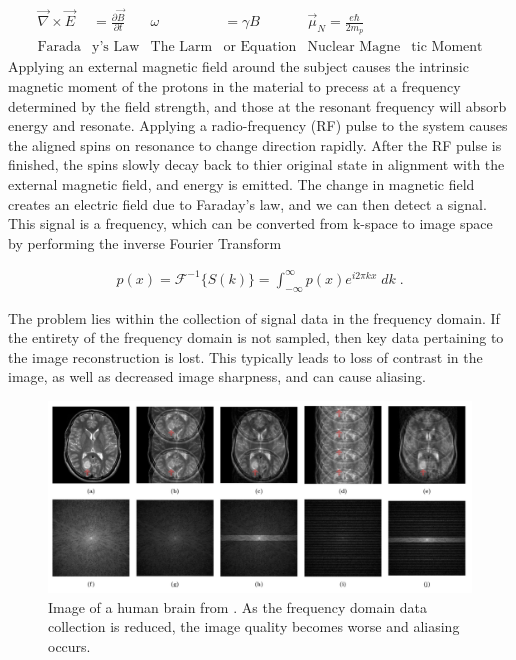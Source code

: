 \documentclass[14pt]{extreport}
\begin{document}
        \begin{align}
            \vec{\nabla} \times \vec{E} &= \frac{\partial \vec{B}}{\partial t} & \omega &= \gamma B & \vec{\mu}_N = \frac{e\hbar}{2m_p}\\
            \text{Farada}&\text{y's Law} & \text{The Larm}&\text{or Equation}&\text{Nuclear Magne}&\text{tic Moment} \nonumber
        \end{align}
        Applying an external magnetic field around the subject causes the intrinsic magnetic moment of the protons in the material to precess at a frequency determined by the field strength, and those at the resonant frequency will absorb energy and resonate. Applying a radio-frequency (RF) pulse to the system causes the aligned spins on resonance to change direction rapidly. After the RF pulse is finished, the spins slowly decay back to thier original state in alignment with the external magnetic field, and energy is emitted. The change in magnetic field creates an electric field due to Faraday's law, and we can then detect a signal. This signal is a frequency, which can be converted from k-space to image space by performing the inverse Fourier Transform

        \begin{align}
            p(x) = \mathcal{F}^{-1}\{ S(k) \} = \int_{-\infty}^{\infty} p(x) e^{i 2\pi k x} \;dk\;.
        \end{align}

        The problem lies within the collection of signal data in the frequency domain. If the entirety of the frequency domain is not sampled, then key data pertaining to the image reconstruction is lost. This typically leads to loss of contrast in the image, as well as decreased image sharpness, and can cause aliasing. 
        
        \begin{figure}[h]
            \begin{center}
                \includegraphics[width = \linewidth]{Brain Images.png}
                \caption{Image of a human brain from \cite{Hyun_Kim_Lee_Lee_Seo_2018}. As the frequency domain data collection is reduced, the image quality becomes worse and aliasing occurs.}
            \end{center}
        \end{figure}
\end{document}
